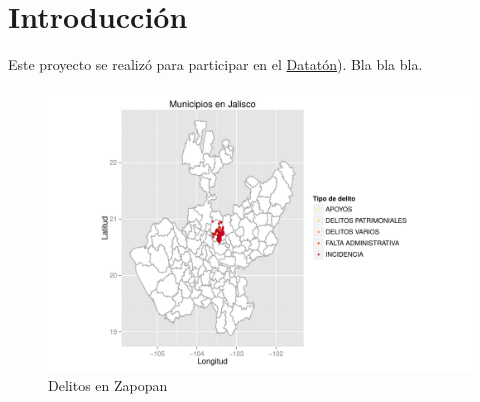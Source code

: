 \newpage
\chapter{Introducción}

\noindent  Este proyecto se realizó para participar en el \href{http://http://dataton.datos.gob.mx}{Datatón}).
Bla bla bla.

\begin{figure}[h]
\centering
\caption{Delitos en Zapopan}
\includegraphics[width=120mm]{../../graphs/munucipios_y_delitos_jalisco.pdf}
\end{figure}


